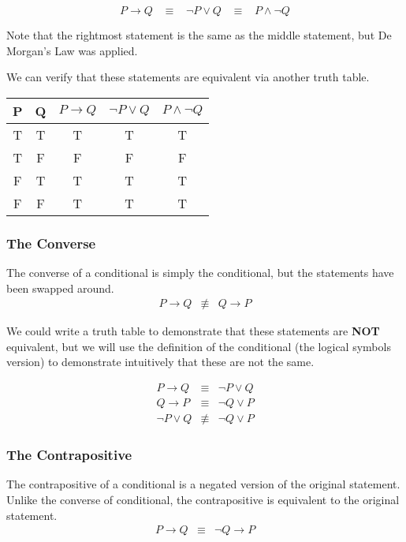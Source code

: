 \documentclass{article}
\begin{document}
\[ P \rightarrow Q \; \; \; \equiv \; \; \; \neg P \lor Q \; \; \; \equiv \; \; \; P \land \neg Q\]

\noindent Note that the rightmost statement is the same as the middle statement, but De Morgan's Law
was applied.

We can verify that these statements are equivalent via another truth table.

\begin{center}
    \begin{tabular}{c | c | c | c | c}
        P & Q & $P \rightarrow Q$ & $\neg P \lor Q$ & $P \land \neg Q$ \\
        \hline
        T & T & T & T & T \\
        T & F & F & F & F \\
        F & T & T & T & T \\
        F & F & T & T & T \\
    \end{tabular}
\end{center}

\subsubsection{The Converse}
The converse of a conditional is simply the conditional, but the statements
have been swapped around.
\begin{eqnarray} \nonumber
    P \rightarrow Q &\not\equiv & Q \rightarrow P
\end{eqnarray}

We could write a truth table to demonstrate that these statements are \textbf{NOT}
equivalent, but we will use the definition of the conditional (the logical symbols
version) to demonstrate intuitively that these are not the same.

\begin{eqnarray} \nonumber
    P \rightarrow Q &\equiv& \neg P \lor Q \\
    Q \rightarrow P &\equiv& \neg Q \lor P \\
    \neg P \lor Q &\not\equiv& \neg Q \lor P
\end{eqnarray}

\subsubsection{The Contrapositive}
The contrapositive of a conditional is a negated version of the original
statement. Unlike the converse of conditional, the contrapositive is 
equivalent to the original statement.
\begin{eqnarray} \nonumber
    P \rightarrow Q &\equiv& \neg Q \rightarrow P
\end{eqnarray}
\end{document}
